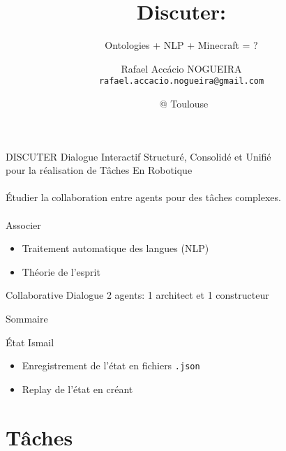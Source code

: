 \documentclass[aspectratio=169]{audition-beamer}
\title[Discuter] %
{Discuter:}
\subtitle
{Ontologies + NLP + Minecraft = ?}
\author[Rafael Accácio Nogueira] %
{Rafael Accácio NOGUEIRA\\
  \texttt{rafael.accacio.nogueira@gmail.com}}
\date{\@date\ @ Toulouse}
\begin{document}
\begin{frame}[plain]
  \titlepage%
\end{frame}



\begin{frame}{DISCUTER}
{\color{auditionPrimary} D}ialogue Interactif Structuré, Consolidé et Unifié\\ pour la réalisation de Tâches En Robotique\pause
\\~\\
Étudier la collaboration entre agents pour des tâches complexes.
\\~\\
\pause Associer \pause
\begin{itemize}
  \item Traitement automatique des langues (NLP)\pause
  \item Théorie de l'esprit
\end{itemize}
\end{frame}

\begin{frame}{Collaborative Dialogue}
{\small \cite{Narayan-ChenEtAl2019}}
2 agents: 1 architect et 1 constructeur
\end{frame}


\begin{frame}{Sommaire}
  \tableofcontents[subsectionstyle=hide/hide/hide]

\end{frame}


\begin{frame}{État}
Ismail

\begin{itemize}
  \item Enregistrement de l'état en fichiers \texttt{.json}
  \item Replay de l'état en créant
\end{itemize}
\end{frame}


\section{Tâches}
\end{document}
